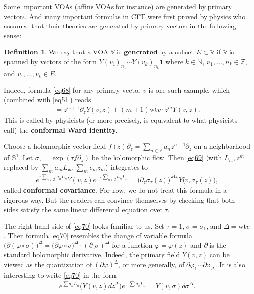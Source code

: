 \documentclass[11pt,b5paper,notitlepage]{article}
\theoremstyle{definition}
\newtheorem{df}{Definition}[section]
\theoremstyle{plain}
\newcommand{\id}{\mathbf{1}}
\newcommand{\Vbb}{\mathbb V}
\newcommand{\Nbb}{\mathbb N}
\newcommand{\Zbb}{\mathbb Z}
\newcommand{\wt}{\mathrm{wt}}
\newcommand{\Sbb}{{\mathbb S}}
\numberwithin{equation}{section}
\begin{document}
Some important VOAs (affine VOAs for instance) are generated by primary vectors. And many important formulas in CFT were first proved by physics who assumed that their theories are generated by primary vectors in the following sense:
\begin{df}\label{lb163} \index{00@Generatig subsets of the VOA $\Vbb$}
	We say that a VOA $\Vbb$ is \textbf{generated} by a subset $E\subset\Vbb$ if $\Vbb$ is spanned by vectors of the form $Y(v_1)_{n_1}\cdots Y(v_k)_{n_k}\id$ where $k\in\Nbb$, $n_1,\dots,n_k\in\Zbb$, and $v_1,\dots,v_k\in E$.
\end{df}
Indeed, formula \eqref{eq68} for any primary vector $v$ is one such example, which (combined with \eqref{eq51}) reads
\begin{align}
	[L_m,Y(v,z)]=z^{m+1}\partial_zY(v,z)+(m+1)\wt v\cdot z^mY(v,z).\label{eq69}
\end{align}
This is called by physicists (or more precisely, is equivalent to what physicists call) the \textbf{conformal Ward identity}. 

Choose a holomorphic vector field $f(z)\partial_z=\sum_{n\in\Zbb} a_n z^{n+1}\partial_z$ on a neighborhood of $\Sbb^1$. Let $\sigma_\tau=\exp(\tau f\partial_z)$ be the holomorphic flow. Then \eqref{eq69} (with $L_m,z^m$ replaced by $\sum_m a_mL_m,\sum_m a_mz_m$) integrates to
\begin{align}
e^{\tau\sum_{n\in\Zbb}a_nL_n}Y(v,z)e^{-\tau\sum_{n\in\Zbb}a_nL_n}=\big(\partial_z\sigma_\tau(z)\big)^{\wt v}Y\big(v,\sigma_\tau(z) \big),\label{eq70}
\end{align}
called \textbf{conformal covariance}.  For now, we do not treat this formula in a rigorous way. But the readers can convince themselves by checking that both sides satisfy the same linear differental equation over $\tau$. 

The right hand side of \eqref{eq70} looks familiar to us. Set $\tau=1$, $\sigma=\sigma_1$, and $\Delta=\wt v$. Then formula \eqref{eq70} resembles the change of variable formula $\big(\partial(\varphi\circ\sigma)\big)^\Delta=\big(\partial\varphi\circ\sigma\big)^\Delta\cdot (\partial_z\sigma)^\Delta$ for a function $\varphi=\varphi(z)$ and $\partial$ is the standard holomorphic derivative. Indeed, the primary field $Y(v,z)$ can be viewed as the quantization of $(\partial\varphi)^\Delta$, or more generally, of $\partial\varphi_1\cdots\partial\varphi_\Delta$. It is also interesting to write \eqref{eq70} in the form
\begin{align}
	e^{\sum a_nL_n}\big(Y(v,z)dz^\Delta \big)e^{-\sum a_nL_n}=Y(v,\sigma)d\sigma^\Delta.
\end{align}
\end{document}
